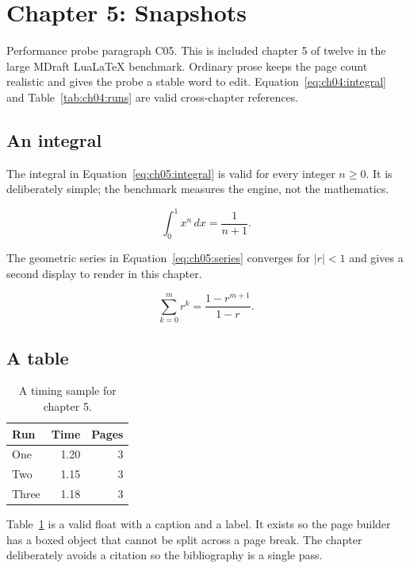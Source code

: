 \section{Chapter 5: Snapshots}
\label{sec:ch05}

Performance probe paragraph C05. This is included chapter 5 of twelve in
the large MDraft LuaLaTeX benchmark. Ordinary prose keeps the page count
realistic and gives the probe a stable word to edit. Equation~\ref{eq:ch04:integral} and
Table~\ref{tab:ch04:runs} are valid cross-chapter references.

\subsection{An integral}
The integral in Equation~\ref{eq:ch05:integral} is valid for every integer
$n \ge 0$. It is deliberately simple; the benchmark measures the engine, not
the mathematics.

\begin{equation}
  \label{eq:ch05:integral}
  \int_{0}^{1} x^{n}\,dx = \frac{1}{n+1}.
\end{equation}

The geometric series in Equation~\ref{eq:ch05:series} converges for
$|r| < 1$ and gives a second display to render in this chapter.

\begin{equation}
  \label{eq:ch05:series}
  \sum_{k=0}^{m} r^{k} = \frac{1-r^{m+1}}{1-r}.
\end{equation}

\subsection{A table}
\begin{table}[h]
  \centering
  \begin{tabular}{lrr}
    \toprule
    Run & Time & Pages \\
    \midrule
    One   & 1.20 & 3 \\
    Two   & 1.15 & 3 \\
    Three & 1.18 & 3 \\
    \bottomrule
  \end{tabular}
  \caption{A timing sample for chapter 5.}
  \label{tab:ch05:runs}
\end{table}

Table~\ref{tab:ch05:runs} is a valid float with a caption and a label. It
exists so the page builder has a boxed object that cannot be split across a
page break. The chapter deliberately avoids a citation so the bibliography is a single pass.

